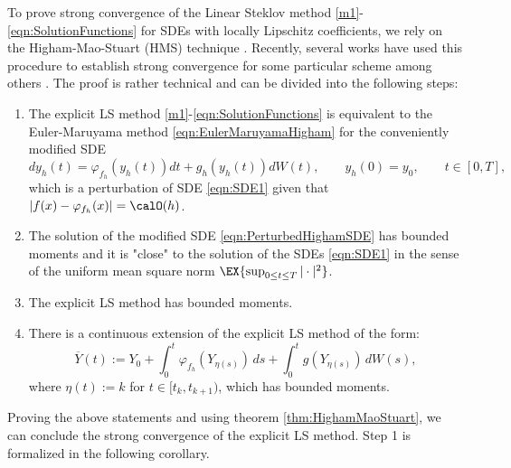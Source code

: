 \documentclass[sort&compress, preprint]{elsarticle}
\theoremstyle{definition}
\theoremstyle{plain}%
\theoremstyle{remark}
\begin{document}
 To prove strong convergence of the Linear Steklov method \eqref{m1}-\eqref{eqn:SolutionFunctions} for  
SDEs with locally Lipschitz coefficients, we rely on the Higham-Mao-Stuart (HMS) technique  
 \cite{Higham2002b}. Recently, several works have used  this  procedure  
 to establish strong convergence for some particular scheme among others \cite{Beyn2010,Guo2014,Hutzenthaler2015,Hutzenthaler2012a,Hutzenthaler2010,Lamba2007,
 Mao2013,Tretyakov2013}. The proof is rather technical and can be divided into the following steps:
 
 \begin{enumerate}[\bf{Step} 1:]
 	\item The explicit LS method \eqref{m1}-\eqref{eqn:SolutionFunctions} is equivalent to 
 	the Euler-Maruyama method \eqref{eqn:EulerMaruyamaHigham} 
	for the conveniently modified SDE
	\begin{equation} \label{eqn:PerturbedHighamSDE}
		dy_h(t)= \varphi_{f_h}(y_h(t))dt +g_h(y_h(t))dW(t),
		\qquad y_h(0)=y_0,  \qquad t\in [0,T],
	\end{equation}
	which is a perturbation of SDE \eqref{eqn:SDE1} given that $|f(x)-\varphi_{f_h}(x)|=\calO(h)$.
	\item\label{stp:PerturbedSolution}
			The solution of the modified SDE \eqref{eqn:PerturbedHighamSDE} has 
			bounded moments and it is 
			"close" to  the solution of the SDEs \eqref{eqn:SDE1}  in the sense of the uniform mean square norm 
			$
				\EX{\sup_{0\leq t\leq T}|\cdot|^2}
			$.
	\item
	\label{stp:MethodBoundedMoments}
		The explicit LS method  has bounded moments.
	\item
		There is a continuous extension of the explicit LS method of the form: 
		\begin{equation}\label{contLS}
		\overline{Y}(t):=Y_0+\int_0^t\varphi_{f_h}(Y_{\eta(s)})\,ds+\int_0^t g(Y_{\eta(s)})\,dW(s), 
		\end{equation}
		where $\eta(t):=k$ for $t\in[t_k,t_{k+1})$, which has bounded moments.
	\end{enumerate}	
	Proving the above statements and using theorem \ref{thm:HighamMaoStuart},
	we can conclude the strong convergence of the explicit LS method. 
	Step 1 is formalized in the following corollary.
	
\end{document}
